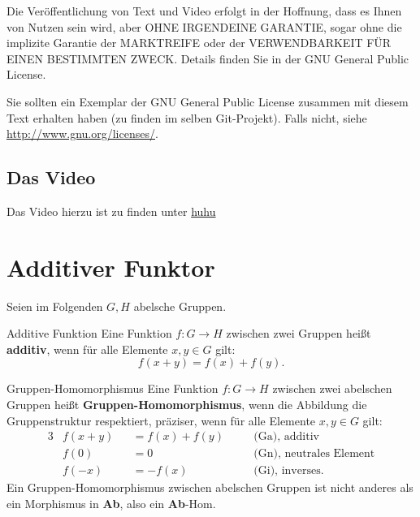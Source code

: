 \documentclass[a4paper]{amsart}
\theoremstyle{definition}
\begin{document}
Die Veröffentlichung von Text und Video erfolgt in der Hoffnung, dass es Ihnen von Nutzen sein wird, 
aber OHNE IRGENDEINE GARANTIE, sogar ohne die implizite Garantie der MARKTREIFE oder der 
VERWENDBARKEIT FÜR EINEN BESTIMMTEN ZWECK. Details finden Sie in der GNU General Public License.

Sie sollten ein Exemplar der GNU General Public License zusammen mit diesem Text erhalten haben 
(zu finden im selben Git-Projekt). 
Falls nicht, siehe \url{http://www.gnu.org/licenses/}.

\subsection*{Das Video}
Das Video hierzu ist zu finden unter 
{\tiny
   \url{huhu}
}

\section{Additiver Funktor}
Seien im Folgenden $G, H$ abelsche Gruppen.
\begin{Definition}{Additive Funktion}
   Eine Funktion $f \colon G \to H$ zwischen zwei Gruppen heißt \textbf{additiv}, wenn für alle Elemente $x,y \in G$ gilt:
   \begin{equation}
      f(x+y) = f(x) + f(y).
   \end{equation}
\end{Definition} 

\begin{Definition}{Gruppen-Homomorphismus}
   Eine Funktion $f \colon G \to H$ zwischen zwei abelschen Gruppen heißt \textbf{Gruppen-Homomorphismus}, wenn die Abbildung die Gruppenstruktur respektiert, präziser, wenn für alle Elemente $x,y \in G$ gilt:
   \begin{alignat}{3}
      &f(x+y) &&= f(x) + f(y) && \quad \text{(Ga), additiv}\\
      &f(0)   &&= 0           && \quad \text{(Gn), neutrales Element}\\
      &f(-x)  &&= -f(x)       && \quad \text{(Gi), inverses}.
   \end{alignat}
   Ein Gruppen-Homomorphismus zwischen abelschen Gruppen ist nicht anderes als ein Morphismus in \textbf{Ab}, also ein \textbf{Ab}-Hom.
\end{Definition} 
\end{document}
